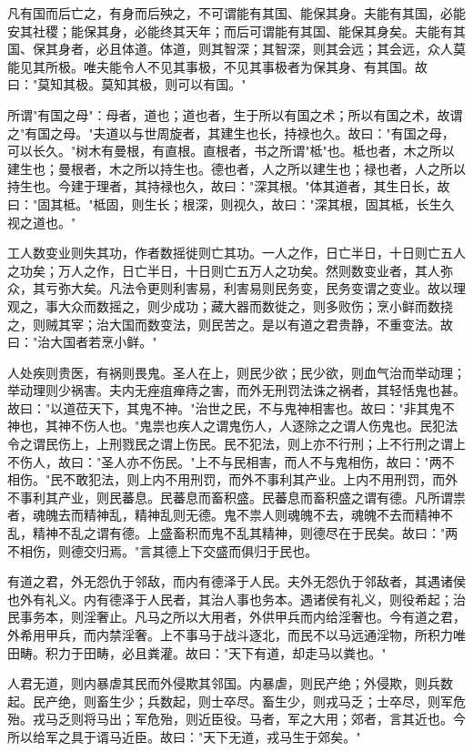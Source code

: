 \documentclass[]{article}
\begin{document}
凡有国而后亡之，有身而后殃之，不可谓能有其国、能保其身。夫能有其国，必能安其社稷；能保其身，必能终其天年；而后可谓能有其国、能保其身矣。夫能有其国、保其身者，必且体道。体道，则其智深；其智深，则其会远；其会远，众人莫能见其所极。唯夫能令人不见其事极，不见其事极者为保其身、有其国。故曰："莫知其极。莫知其极，则可以有国。"

所谓"有国之母"：母者，道也；道也者，生于所以有国之术；所以有国之术，故谓之"有国之母。"夫道以与世周旋者，其建生也长，持禄也久。故曰："有国之母，可以长久。"树木有曼根，有直根。直根者，书之所谓"柢"也。柢也者，木之所以建生也；曼根者，木之所以持生也。德也者，人之所以建生也；禄也者，人之所以持生也。今建于理者，其持禄也久，故曰："深其根。"体其道者，其生日长，故曰："固其柢。"柢固，则生长；根深，则视久，故曰："深其根，固其柢，长生久视之道也。"

工人数变业则失其功，作者数摇徙则亡其功。一人之作，日亡半日，十日则亡五人之功矣；万人之作，日亡半日，十日则亡五万人之功矣。然则数变业者，其人弥众，其亏弥大矣。凡法令更则利害易，利害易则民务变，民务变谓之变业。故以理观之，事大众而数摇之，则少成功；藏大器而数徙之，则多败伤；烹小鲜而数挠之，则贼其宰；治大国而数变法，则民苦之。是以有道之君贵静，不重变法。故曰："治大国者若烹小鲜。"

人处疾则贵医，有祸则畏鬼。圣人在上，则民少欲；民少欲，则血气治而举动理；举动理则少祸害。夫内无痤疽瘅痔之害，而外无刑罚法诛之祸者，其轻恬鬼也甚。故曰："以道莅天下，其鬼不神。"治世之民，不与鬼神相害也。故曰："非其鬼不神也，其神不伤人也。"鬼祟也疾人之谓鬼伤人，人逐除之之谓人伤鬼也。民犯法令之谓民伤上，上刑戮民之谓上伤民。民不犯法，则上亦不行刑；上不行刑之谓上不伤人，故曰："圣人亦不伤民。"上不与民相害，而人不与鬼相伤，故曰："两不相伤。"民不敢犯法，则上内不用刑罚，而外不事利其产业。上内不用刑罚，而外不事利其产业，则民蕃息。民蕃息而畜积盛。民蕃息而畜积盛之谓有德。凡所谓祟者，魂魄去而精神乱，精神乱则无德。鬼不祟人则魂魄不去，魂魄不去而精神不乱，精神不乱之谓有德。上盛畜积而鬼不乱其精神，则德尽在于民矣。故曰："两不相伤，则德交归焉。"言其德上下交盛而俱归于民也。

有道之君，外无怨仇于邻敌，而内有德泽于人民。夫外无怨仇于邻敌者，其遇诸侯也外有礼义。内有德泽于人民者，其治人事也务本。遇诸侯有礼义，则役希起；治民事务本，则淫奢止。凡马之所以大用者，外供甲兵而内给淫奢也。今有道之君，外希用甲兵，而内禁淫奢。上不事马于战斗逐北，而民不以马远通淫物，所积力唯田畴。积力于田畴，必且粪灌。故曰："天下有道，却走马以粪也。"

人君无道，则内暴虐其民而外侵欺其邻国。内暴虐，则民产绝；外侵欺，则兵数起。民产绝，则畜生少；兵数起，则士卒尽。畜生少，则戎马乏；士卒尽，则军危殆。戎马乏则将马出；军危殆，则近臣役。马者，军之大用；郊者，言其近也。今所以给军之具于谞马近臣。故曰："天下无道，戎马生于郊矣。"
\end{document}
